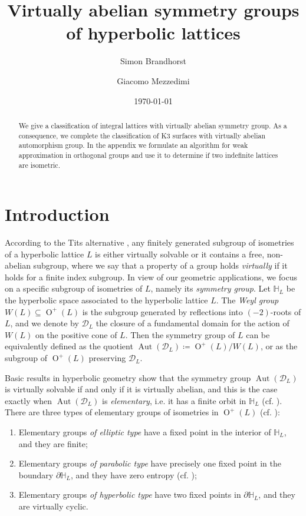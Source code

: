 \documentclass[11pt,letterpaper]{amsart}
\title{Virtually abelian symmetry groups of hyperbolic lattices}
\author{Simon Brandhorst}
\author{Giacomo Mezzedimi}
\date{\today}
\DeclareMathOperator{\Aut}{Aut}
\DeclareMathOperator{\Or}{O}
\newcommand{\HH}{\mathbb{H}}
\theoremstyle{definition}
\theoremstyle{remark}
\begin{document}
\maketitle
\begin{abstract}
    We give a classification of integral lattices with virtually abelian symmetry group. As a consequence, we complete the classification of K3 surfaces with virtually abelian automorphism group.
    In the appendix we formulate an algorithm for weak approximation in orthogonal groups and use it to determine if two indefinite lattices are isometric. 
\end{abstract}


\section{Introduction}

According to the Tits alternative \cite{tits}, any finitely generated subgroup of isometries of a hyperbolic lattice $L$ is either virtually solvable or it contains a free, non-abelian subgroup, where we say that a property of a group holds \emph{virtually} if it holds for a finite index subgroup. In view of our geometric applications, we focus on a specific subgroup of isometries of $L$, namely its \emph{symmetry group}. Let $\HH_L$ be the hyperbolic space associated to the hyperbolic lattice $L$. The \emph{Weyl group} $W(L)\subseteq \Or^+(L)$ is the subgroup generated by reflections into $(-2)$-roots of $L$, and we denote by $\mathcal{D}_L$ the closure of a fundamental domain for the action of $W(L)$ on the positive cone of $L$. Then the symmetry group of $L$ can be equivalently defined as the quotient $\Aut(\mathcal{D}_L) \coloneqq \Or^+(L)/W(L)$, or as the subgroup of $\Or^+(L)$ preserving $\mathcal{D}_L$.

Basic results in hyperbolic geometry show that the symmetry group $\Aut(\mathcal{D}_L)$ is virtually solvable if and only if it is virtually abelian, and this is the case exactly when $\Aut(\mathcal{D}_L)$ is \emph{elementary}, i.e. it has a finite orbit in $\HH_L$ (cf. \cite[Theorems~5.5.9~and~5.5.10]{ratcliffe}). There are three types of elementary groups of isometries in $\Or^+(L)$ (cf. \cite[§5.5]{ratcliffe}):
\begin{enumerate}
\item Elementary groups \emph{of elliptic type} have a fixed point in the interior of $\HH_L$, and they are finite;
\item Elementary groups \emph{of parabolic type} have precisely one fixed point in the boundary $\partial \HH_L$, and they have zero entropy (cf. \cite[Theorem~3.7]{brandhorst.mezzedimi});
\item Elementary groups \emph{of hyperbolic type} have two fixed points in $\partial \HH_L$, and they are virtually cyclic.
\end{enumerate}
\end{document}
